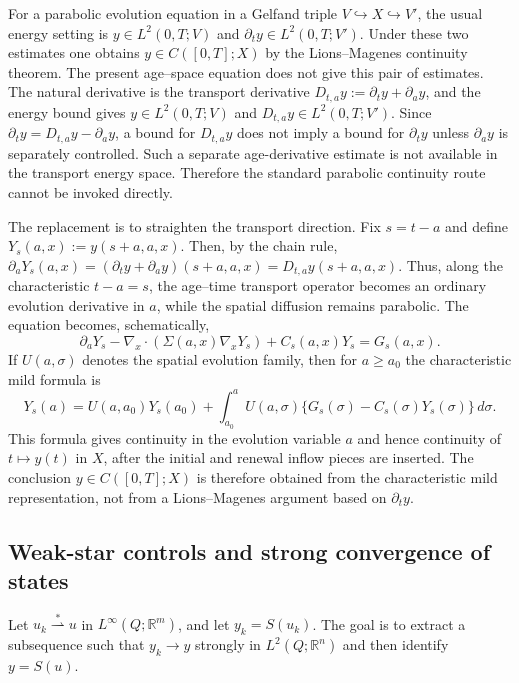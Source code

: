 \documentclass[pdflatex,sn-mathphys-num]{sn-jnl}
\theoremstyle{plain}
\theoremstyle{definition}
\theoremstyle{remark}
\newcommand{\R}{\mathbb R}
\begin{document}
For a parabolic evolution equation in a Gelfand triple \(V\hookrightarrow
X\hookrightarrow V'\), the usual energy setting is \(y\in L^2(0,T;V)\) and
\(\partial_t y\in L^2(0,T;V')\). Under these two estimates one obtains
\(y\in C([0,T];X)\) by the Lions--Magenes continuity theorem. The present
age--space equation does not give this pair of estimates. The natural
derivative is the transport derivative \(D_{t,a}y:=\partial_t y+\partial_a y\),
and the energy bound gives \(y\in L^2(0,T;V)\) and \(D_{t,a}y\in
L^2(0,T;V')\). Since \(\partial_t y=D_{t,a}y-\partial_a y\), a bound for
\(D_{t,a}y\) does not imply a bound for \(\partial_t y\) unless
\(\partial_a y\) is separately controlled. Such a separate age-derivative
estimate is not available in the transport energy space. Therefore the
standard parabolic continuity route cannot be invoked directly.

The replacement is to straighten the transport direction. Fix
\(s=t-a\) and define \(Y_s(a,x):=y(s+a,a,x)\). Then, by the chain rule,
\(\partial_aY_s(a,x)=(\partial_t y+\partial_a y)(s+a,a,x)=D_{t,a}y(s+a,a,x)\).
Thus, along the characteristic \(t-a=s\), the age--time transport operator
becomes an ordinary evolution derivative in \(a\), while the spatial diffusion
remains parabolic. The equation becomes, schematically,
\[
\partial_aY_s-\nabla_x\cdot(\Sigma(a,x)\nabla_xY_s)+C_s(a,x)Y_s=G_s(a,x).
\]
If \(U(a,\sigma)\) denotes the spatial evolution family, then for
\(a\ge a_0\) the characteristic mild formula is
\[
Y_s(a)=U(a,a_0)Y_s(a_0)+\int_{a_0}^aU(a,\sigma)
\{G_s(\sigma)-C_s(\sigma)Y_s(\sigma)\}\,d\sigma .
\]
This formula gives continuity in the evolution variable \(a\) and hence
continuity of \(t\mapsto y(t)\) in \(X\), after the initial and renewal inflow
pieces are inserted. The conclusion \(y\in C([0,T];X)\) is therefore obtained
from the characteristic mild representation, not from a Lions--Magenes
argument based on \(\partial_t y\).

\subsection{Weak-star controls and strong convergence of states}
\label{app:weakstar-strong}

Let \(u_k\overset{*}{\rightharpoonup}u\) in \(L^\infty(Q;\R^m)\), and let
\(y_k=S(u_k)\). The goal is to extract a subsequence such that \(y_k\to y\)
strongly in \(L^2(Q;\R^n)\) and then identify \(y=S(u)\).
\end{document}
